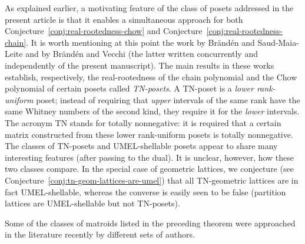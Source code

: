 \documentclass[11pt,a4paper]{amsart}
\theoremstyle{results}
\theoremstyle{definitions}
\begin{document}
As explained earlier, a motivating feature of the class of posets addressed in the present article is that it enables a simultaneous approach for both Conjecture~\ref{conj:real-rootedness-chow} and Conjecture~\ref{conj:real-rootedness-chain}. It is worth mentioning at this point the work by Br\"and\'en and Saud-Maia-Leite \cite{branden-saud1,branden-saud2} and by Br\"and\'en and Vecchi \cite{branden-vecchi2} (the latter written concurrently and independently of the present manuscript). The main results in these works establish, respectively, the real-rootedness of the chain polynomial and the Chow polynomial of certain posets called \emph{TN-posets}. A TN-poset is a \emph{lower rank-uniform} poset; instead of requiring that \emph{upper} intervals of the same rank have the same Whitney numbers of the second kind, they require it for the \emph{lower} intervals. The acronym TN stands for totally nonnegative: it is required that a certain matrix constructed from these lower rank-uniform posets is totally nonnegative. The classes of TN-posets and UMEL-shellable posets appear to share many interesting features (after passing to the dual). It is unclear, however, how these two classes compare. In the special case of geometric lattices, we conjecture (see Conjecture~\ref{conj:tn-geom-lattices-are-umel}) that all TN-geometric lattices are in fact UMEL-shellable, whereas the converse is easily seen to be false (partition lattices are UMEL-shellable but not TN-posets). 

Some of the classes of matroids listed in the preceding theorem were approached in the literature recently by different sets of authors.
\end{document}
